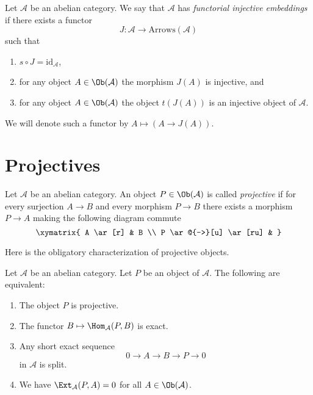\begin{definition}
\label{definition-functorial-injective-embedding}
Let $\mathcal{A}$ be an abelian category.
We say that $\mathcal{A}$ has {\it functorial injective embeddings}
if there exists a functor
$$
J : \mathcal{A} \longrightarrow \text{Arrows}(\mathcal{A})
$$
such that
\begin{enumerate}
\item $s \circ J = \text{id}_\mathcal{A}$,
\item for any object $A \in \Ob(\mathcal{A})$
the morphism $J(A)$ is injective, and
\item for any object $A \in \Ob(\mathcal{A})$
the object $t(J(A))$ is an injective object of $\mathcal{A}$.
\end{enumerate}
We will denote such a functor by
$A \mapsto (A \to J(A))$.
\end{definition}





\section{Projectives}
\label{section-projectives}

\begin{definition}
\label{definition-projective}
Let $\mathcal{A}$ be an abelian category.
An object $P \in \Ob(\mathcal{A})$ is
called {\it projective} if for every surjection
$A \rightarrow B$ and every morphism
$P \to B$ there exists a morphism $P \to A$ making
the following diagram commute
$$
\xymatrix{
A \ar[r] & B \\
P \ar@{-->}[u] \ar[ru] &
}
$$
\end{definition}

\noindent
Here is the obligatory characterization of projective objects.

\begin{lemma}
\label{lemma-characterize-projectives}
Let $\mathcal{A}$ be an abelian category.
Let $P$ be an object of $\mathcal{A}$.
The following are equivalent:
\begin{enumerate}
\item The object $P$ is projective.
\item The functor $B \mapsto \Hom_\mathcal{A}(P, B)$
is exact.
\item Any short exact sequence
$$
0 \to A \to B \to P \to 0
$$
in $\mathcal{A}$ is split.
\item We have $\Ext_\mathcal{A}(P, A) = 0$ for
all $A \in \Ob(\mathcal{A})$.
\end{enumerate}
\end{lemma}

